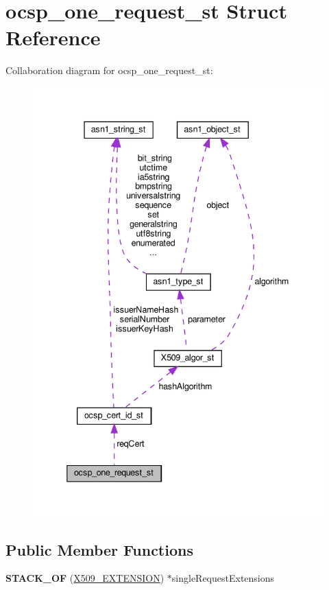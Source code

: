 \hypertarget{structocsp__one__request__st}{}\section{ocsp\+\_\+one\+\_\+request\+\_\+st Struct Reference}
\label{structocsp__one__request__st}


Collaboration diagram for ocsp\+\_\+one\+\_\+request\+\_\+st\+:
\nopagebreak
\begin{figure}[H]
\begin{center}
\leavevmode
\includegraphics[width=339pt]{structocsp__one__request__st__coll__graph}
\end{center}
\end{figure}
\subsection*{Public Member Functions}
\begin{DoxyCompactItemize}
\item 
\mbox{\label{structocsp__one__request__st_af1c47eb44df3e6c48e9a904b7cec0011}} 
{\bfseries S\+T\+A\+C\+K\+\_\+\+OF} (\hyperlink{structX509__extension__st}{X509\+\_\+\+E\+X\+T\+E\+N\+S\+I\+ON}) $\ast$single\+Request\+Extensions
\end{DoxyCompactItemize}
